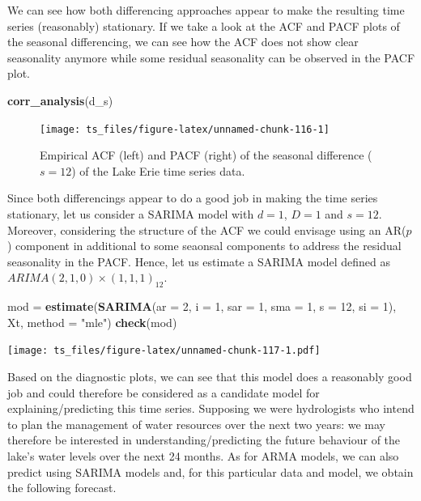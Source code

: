 \documentclass[]{book}
\newenvironment{Shaded}{\begin{snugshade}}{\end{snugshade}}
\newcommand{\KeywordTok}[1]{\textcolor[rgb]{0.13,0.29,0.53}{\textbf{#1}}}
\newcommand{\DataTypeTok}[1]{\textcolor[rgb]{0.13,0.29,0.53}{#1}}
\newcommand{\DecValTok}[1]{\textcolor[rgb]{0.00,0.00,0.81}{#1}}
\newcommand{\StringTok}[1]{\textcolor[rgb]{0.31,0.60,0.02}{#1}}
\newcommand{\NormalTok}[1]{#1}
\theoremstyle{definition}
\theoremstyle{definition}
\theoremstyle{definition}
\theoremstyle{remark}
\begin{document}
We can see how both differencing approaches appear to make the resulting
time series (reasonably) stationary. If we take a look at the ACF and
PACF plots of the seasonal differencing, we can see how the ACF does not
show clear seasonality anymore while some residual seasonality can be
observed in the PACF plot.

\begin{Shaded}
\begin{Highlighting}[]
\KeywordTok{corr_analysis}\NormalTok{(d_s)}
\end{Highlighting}
\end{Shaded}

\begin{figure}

{\centering \texttt{[image: ts\_files/figure-latex/unnamed-chunk-116-1]} 

}

\caption{Empirical ACF (left) and PACF (right) of the seasonal difference ($s = 12$) of the Lake Erie time series data.}\label{fig:unnamed-chunk-116}
\end{figure}

Since both differencings appear to do a good job in making the time
series stationary, let us consider a SARIMA model with \(d=1\), \(D=1\)
and \(s = 12\). Moreover, considering the structure of the ACF we could
envisage using an AR(\(p\)) component in additional to some seaonsal
components to address the residual seasonality in the PACF. Hence, let
us estimate a SARIMA model defined as
\(ARIMA(2,1,0)\times(1,1,1)_{12}\).

\begin{Shaded}
\begin{Highlighting}[]
\NormalTok{mod =}\StringTok{ }\KeywordTok{estimate}\NormalTok{(}\KeywordTok{SARIMA}\NormalTok{(}\DataTypeTok{ar =} \DecValTok{2}\NormalTok{, }\DataTypeTok{i =} \DecValTok{1}\NormalTok{, }\DataTypeTok{sar =} \DecValTok{1}\NormalTok{, }\DataTypeTok{sma =} \DecValTok{1}\NormalTok{, }\DataTypeTok{s =} \DecValTok{12}\NormalTok{, }\DataTypeTok{si =} \DecValTok{1}\NormalTok{), Xt, }\DataTypeTok{method =} \StringTok{"mle"}\NormalTok{)}
\KeywordTok{check}\NormalTok{(mod)}
\end{Highlighting}
\end{Shaded}

\texttt{[image: ts\_files/figure-latex/unnamed-chunk-117-1.pdf]}

Based on the diagnostic plots, we can see that this model does a
reasonably good job and could therefore be considered as a candidate
model for explaining/predicting this time series. Supposing we were
hydrologists who intend to plan the management of water resources over
the next two years: we may therefore be interested in
understanding/predicting the future behaviour of the lake's water levels
over the next 24 months. As for ARMA models, we can also predict using
SARIMA models and, for this particular data and model, we obtain the
following forecast.
\end{document}
